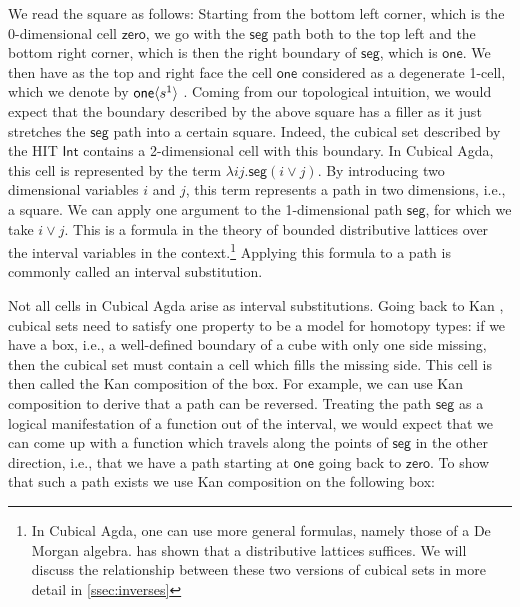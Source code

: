 \documentclass{llncs}
\newcommand{\smap}[1]{s^{{#1}}}
\newcommand{\cont}[2]{\ensuremath{ \ifthenelse{\equal{#2}{}}{#1}{{#1}\langle{#2}\rangle}} }
\newcommand{\cset}[1]{\ensuremath{\mathsf{{#1}}}}
\begin{document}
We read the square as follows: Starting from the bottom left corner, which is
the 0-dimensional cell \cset{zero}, we go with the \cset{seg} path both to the
top left and the bottom right corner, which is then the right boundary of
\cset{seg}, which is \cset{one}. We then have as the top and right face 
the cell \cset{one} considered as a degenerate 1-cell, which we denote by
\cont{\cset{one}}{\smap{1}}. Coming from our topological intuition, we would
expect that the boundary described by the above square has a filler as it just
stretches the \cset{seg} path into a certain square. Indeed, the cubical set
described by the HIT \cset{Int} contains a 2-dimensional cell with
this boundary. In Cubical Agda, this cell is represented by the term
$\lambda i j .\cset{seg} (i \vee j)$. By introducing two dimensional variables
$i$ and $j$, this term represents a path
in two dimensions, i.e., a square. We can apply one argument to the
1-dimensional path
\cset{seg}, for which we take $i \vee j$. This is a formula in the theory of
bounded distributive lattices over the interval variables in the
context.\footnote{In Cubical Agda, one can use more general formulas, namely
  those of a De Morgan algebra. \cite{orton17_axiom_model_cubic_type_theor_topos} has shown
  that a distributive lattices suffices. We will discuss the
  relationship between these two versions of cubical sets in more detail in
  \autoref{ssec:inverses}}
Applying this formula to a path is commonly called an interval substitution.

Not all cells in Cubical Agda arise as interval substitutions. Going
back to Kan \cite{kan55_abstr_homot}, cubical sets need to satisfy one property
to be a model for homotopy types: if we have a box, i.e., a
well-defined boundary of a cube with only one side missing, then the cubical set
must contain a cell
which fills the missing side. This cell is then called the Kan composition of
the box. For example, we can use Kan composition to derive that a path can be reversed. 
Treating the path \cset{seg} as a logical manifestation of a function out of the
interval, we would expect that we can come up with a function which travels
along the points of \cset{seg} in the other direction, i.e., that we have a path starting at
\cset{one} going back to \cset{zero}. To show that such a path exists we use Kan
composition on the following box:

\begin{center}
\end{center}
\end{document}
